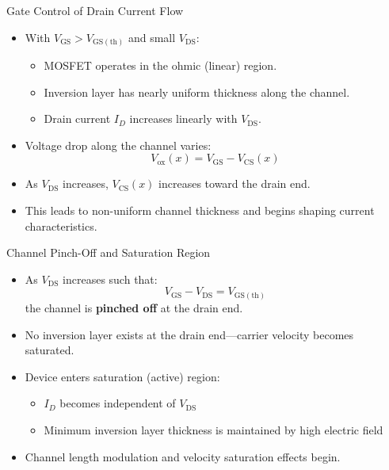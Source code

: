 \begin{frame}{Gate Control of Drain Current Flow}
\begin{itemize}
    \item With $V_{\mathrm{GS}} > V_{\mathrm{GS(th)}}$ and small $V_{\mathrm{DS}}$:
    \begin{itemize}
        \item MOSFET operates in the ohmic (linear) region.
        \item Inversion layer has nearly uniform thickness along the channel.
        \item Drain current $I_D$ increases linearly with $V_{\mathrm{DS}}$.
    \end{itemize}
    \item Voltage drop along the channel varies:
    \[
        V_{\mathrm{ox}}(x) = V_{\mathrm{GS}} - V_{\mathrm{CS}}(x)
    \]
    \item As $V_{\mathrm{DS}}$ increases, $V_{\mathrm{CS}}(x)$ increases toward the drain end.
    \item This leads to non-uniform channel thickness and begins shaping current characteristics.
\end{itemize}
\end{frame}


\begin{frame}{Channel Pinch-Off and Saturation Region}
\begin{itemize}
    \item As $V_{\mathrm{DS}}$ increases such that:
    \[
        V_{\mathrm{GS}} - V_{\mathrm{DS}} = V_{\mathrm{GS(th)}}
    \]
    the channel is \textbf{pinched off} at the drain end.
    \item No inversion layer exists at the drain end—carrier velocity becomes saturated.
    \item Device enters saturation (active) region:
    \begin{itemize}
        \item $I_D$ becomes independent of $V_{\mathrm{DS}}$
        \item Minimum inversion layer thickness is maintained by high electric field
    \end{itemize}
    \item Channel length modulation and velocity saturation effects begin.
\end{itemize}
\end{frame}


